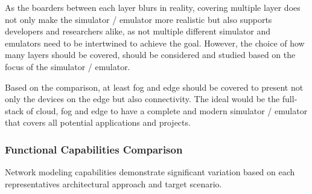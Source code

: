 As the boarders between each layer blurs in reality, covering multiple layer does not only make the simulator / emulator more realistic but also supports developers and researchers alike, as not multiple different simulator and emulators need to be intertwined to achieve the goal.
However, the choice of how many layers should be covered, should be considered and studied based on the focus of the simulator / emulator.

Based on the comparison, at least fog and edge should be covered to present not only the devices on the edge but also connectivity. 
The ideal would be the full-stack of cloud, fog and edge to have a complete and modern simulator / emulator that covers all potential applications and projects.

\subsubsection{Functional Capabilities Comparison}
Network modeling capabilities demonstrate significant variation based on each representatives architectural approach and target scenario.

